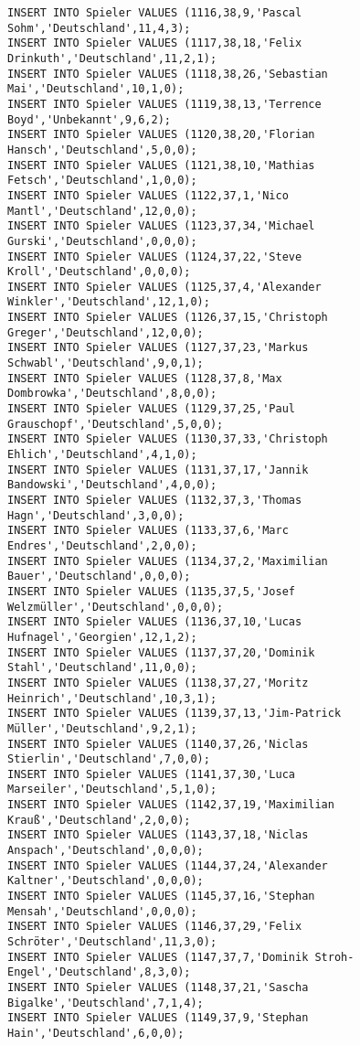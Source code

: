 \documentclass{lehramt-informatik-aufgabe}
\begin{document}
\begin{verbatim}
INSERT INTO Spieler VALUES (1116,38,9,'Pascal Sohm','Deutschland',11,4,3);
INSERT INTO Spieler VALUES (1117,38,18,'Felix Drinkuth','Deutschland',11,2,1);
INSERT INTO Spieler VALUES (1118,38,26,'Sebastian Mai','Deutschland',10,1,0);
INSERT INTO Spieler VALUES (1119,38,13,'Terrence Boyd','Unbekannt',9,6,2);
INSERT INTO Spieler VALUES (1120,38,20,'Florian Hansch','Deutschland',5,0,0);
INSERT INTO Spieler VALUES (1121,38,10,'Mathias Fetsch','Deutschland',1,0,0);
INSERT INTO Spieler VALUES (1122,37,1,'Nico Mantl','Deutschland',12,0,0);
INSERT INTO Spieler VALUES (1123,37,34,'Michael Gurski','Deutschland',0,0,0);
INSERT INTO Spieler VALUES (1124,37,22,'Steve Kroll','Deutschland',0,0,0);
INSERT INTO Spieler VALUES (1125,37,4,'Alexander Winkler','Deutschland',12,1,0);
INSERT INTO Spieler VALUES (1126,37,15,'Christoph Greger','Deutschland',12,0,0);
INSERT INTO Spieler VALUES (1127,37,23,'Markus Schwabl','Deutschland',9,0,1);
INSERT INTO Spieler VALUES (1128,37,8,'Max Dombrowka','Deutschland',8,0,0);
INSERT INTO Spieler VALUES (1129,37,25,'Paul Grauschopf','Deutschland',5,0,0);
INSERT INTO Spieler VALUES (1130,37,33,'Christoph Ehlich','Deutschland',4,1,0);
INSERT INTO Spieler VALUES (1131,37,17,'Jannik Bandowski','Deutschland',4,0,0);
INSERT INTO Spieler VALUES (1132,37,3,'Thomas Hagn','Deutschland',3,0,0);
INSERT INTO Spieler VALUES (1133,37,6,'Marc Endres','Deutschland',2,0,0);
INSERT INTO Spieler VALUES (1134,37,2,'Maximilian Bauer','Deutschland',0,0,0);
INSERT INTO Spieler VALUES (1135,37,5,'Josef Welzmüller','Deutschland',0,0,0);
INSERT INTO Spieler VALUES (1136,37,10,'Lucas Hufnagel','Georgien',12,1,2);
INSERT INTO Spieler VALUES (1137,37,20,'Dominik Stahl','Deutschland',11,0,0);
INSERT INTO Spieler VALUES (1138,37,27,'Moritz Heinrich','Deutschland',10,3,1);
INSERT INTO Spieler VALUES (1139,37,13,'Jim-Patrick Müller','Deutschland',9,2,1);
INSERT INTO Spieler VALUES (1140,37,26,'Niclas Stierlin','Deutschland',7,0,0);
INSERT INTO Spieler VALUES (1141,37,30,'Luca Marseiler','Deutschland',5,1,0);
INSERT INTO Spieler VALUES (1142,37,19,'Maximilian Krauß','Deutschland',2,0,0);
INSERT INTO Spieler VALUES (1143,37,18,'Niclas Anspach','Deutschland',0,0,0);
INSERT INTO Spieler VALUES (1144,37,24,'Alexander Kaltner','Deutschland',0,0,0);
INSERT INTO Spieler VALUES (1145,37,16,'Stephan Mensah','Deutschland',0,0,0);
INSERT INTO Spieler VALUES (1146,37,29,'Felix Schröter','Deutschland',11,3,0);
INSERT INTO Spieler VALUES (1147,37,7,'Dominik Stroh-Engel','Deutschland',8,3,0);
INSERT INTO Spieler VALUES (1148,37,21,'Sascha Bigalke','Deutschland',7,1,4);
INSERT INTO Spieler VALUES (1149,37,9,'Stephan Hain','Deutschland',6,0,0);

\end{verbatim}
\end{document}
